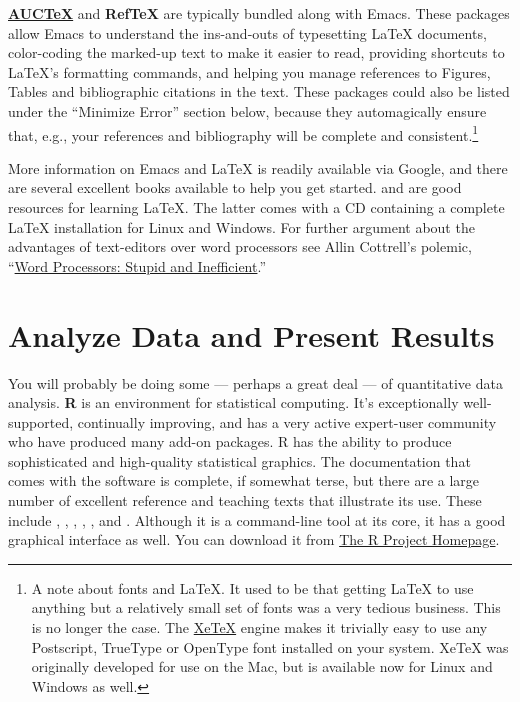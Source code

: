 \documentclass[11pt,article,oneside]{memoir}
\begin{document}
\textbf{\href{http://www.gnu.org/software/auctex/}{AUCTeX}} and \textbf{RefTeX} are typically bundled along with Emacs. These packages allow Emacs to understand the ins-and-outs of typesetting LaTeX documents, color-coding the marked-up text to make it easier to read, providing shortcuts to LaTeX's formatting commands, and helping you manage references to Figures, Tables and bibliographic citations in the text. These packages could also be listed under the ``Minimize Error'' section below, because they automagically ensure that, e.g., your references and bibliography will be complete and consistent.\footnote{A note about fonts and LaTeX. It used to be that getting LaTeX to use anything but a relatively small set of fonts was a very tedious business. This is no longer the case. The \href{http://scripts.sil.org/cms/scripts/page.php?site_id=nrsi&id=xetex}{XeTeX} engine makes it trivially easy to use any Postscript, TrueType or OpenType font installed on your system. XeTeX was originally developed for use on the Mac, but is available now for Linux and Windows as well.} 

More information on Emacs and LaTeX is readily available via Google, and there are several excellent books available to help you get started. \citet{kopka03:_guide_latex} and \citet{mittlebach04:_latex_compan} are good resources for learning LaTeX. The latter comes with a CD containing a complete LaTeX installation for Linux and Windows. For further argument about the advantages of text-editors over word processors see Allin Cottrell's polemic, ``\href{http://www.ecn.wfu.edu/~cottrell/wp.html}{Word Processors: Stupid and Inefficient}.''
     
\section{Analyze Data and Present Results} 
You will probably be doing some --- perhaps a great deal --- of quantitative data analysis. \textbf{R} is an environment for statistical computing. It's exceptionally well-supported, continually improving, and has a very active expert-user community who have produced many add-on packages. R has the ability to produce sophisticated and high-quality statistical graphics. The documentation that comes with the software is complete, if somewhat terse, but there are a large number of excellent reference and teaching texts that illustrate its use. These include \citet{dalgaard02:_introd_statis_r}, \citet{venables02:_moder_applied_statis_s_plus}, \citet{maindonald03:_data_analy_graph_using_r}, \citet{fox02:_r_s_plus_compan_applied_regres}, \citet{frank01:_regres_model_strat}, and 
\citet{gelmanhill07:data_analysis}. Although it is a command-line tool at its core, it has a good graphical interface as well. You can download it from \href{http://www.r-project.org/}{The R Project Homepage}.     
\end{document}
